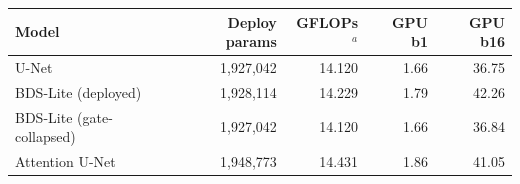 \begin{tabular*}{\linewidth}{@{\extracolsep{\fill}}lrrrr@{}}
\toprule
Model & Deploy params & GFLOPs$^a$ & GPU b1 & GPU b16 \\
\midrule
U-Net & 1,927,042 & 14.120 & 1.66 & 36.75 \\
BDS-Lite (deployed) & 1,928,114 & 14.229 & 1.79 & 42.26 \\
BDS-Lite (gate-collapsed) & 1,927,042 & 14.120 & 1.66 & 36.84 \\
Attention U-Net & 1,948,773 & 14.431 & 1.86 & 41.05 \\
\bottomrule
\end{tabular*}
